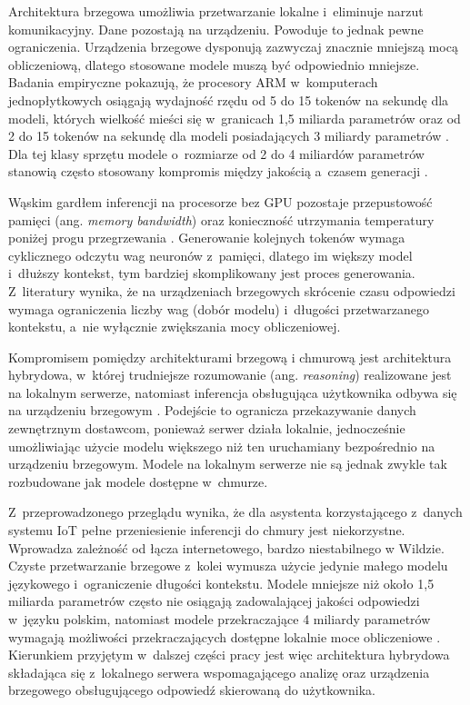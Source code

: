 Architektura brzegowa umożliwia przetwarzanie lokalne i~eliminuje narzut komunikacyjny. Dane pozostają na urządzeniu. Powoduje to jednak pewne ograniczenia. Urządzenia brzegowe dysponują zazwyczaj znacznie mniejszą mocą obliczeniową, dlatego stosowane modele muszą być odpowiednio mniejsze. Badania empiryczne pokazują, że procesory ARM w~komputerach jednopłytkowych osiągają wydajność rzędu od 5 do 15 tokenów na sekundę dla modeli, których wielkość mieści się w~granicach 1,5 miliarda parametrów oraz od 2 do 15 tokenów na sekundę dla modeli posiadających 3 miliardy parametrów \cite{Nguyen2025SBC}. Dla tej klasy sprzętu modele o~rozmiarze od 2 do 4 miliardów parametrów stanowią często stosowany kompromis między jakością a~czasem generacji \cite{Nguyen2025SBC}. 

Wąskim gardłem inferencji na procesorze bez GPU pozostaje przepustowość pamięci (ang. \emph{memory bandwidth}) oraz konieczność utrzymania temperatury poniżej progu przegrzewania \cite{Kim2023SqueezeLLM,Tummalapalli2026}. Generowanie kolejnych tokenów wymaga cyklicznego odczytu wag neuronów z~pamięci, dlatego im większy model i~dłuższy kontekst, tym bardziej skomplikowany jest proces generowania. Z~literatury wynika, że na urządzeniach brzegowych skrócenie czasu odpowiedzi wymaga ograniczenia liczby wag (dobór modelu) i~długości przetwarzanego kontekstu, a~nie wyłącznie zwiększania mocy obliczeniowej.

Kompromisem pomiędzy architekturami brzegową i chmurową jest architektura hybrydowa, w~której trudniejsze rozumowanie (ang. \emph{reasoning}) realizowane jest na lokalnym serwerze, natomiast inferencja obsługująca użytkownika odbywa się na urządzeniu brzegowym \cite{Renney2026}. Podejście to ogranicza przekazywanie danych zewnętrznym dostawcom, ponieważ serwer działa lokalnie, jednocześnie umożliwiając użycie modelu większego niż ten uruchamiany bezpośrednio na urządzeniu brzegowym. Modele na lokalnym serwerze nie są jednak zwykle tak rozbudowane jak modele dostępne w~chmurze.

Z~przeprowadzonego przeglądu wynika, że dla asystenta korzystającego z~danych systemu IoT pełne przeniesienie inferencji do chmury jest niekorzystne. Wprowadza zależność od łącza internetowego, bardzo niestabilnego w Wildzie. Czyste przetwarzanie brzegowe z~kolei wymusza użycie jedynie małego modelu językowego i~ograniczenie długości kontekstu. Modele mniejsze niż około 1,5 miliarda parametrów często nie osiągają zadowalającej jakości odpowiedzi w~języku polskim, natomiast modele przekraczające 4 miliardy parametrów wymagają możliwości przekraczających dostępne lokalnie moce obliczeniowe \cite{Nguyen2025SBC}. Kierunkiem przyjętym w~dalszej części pracy jest więc architektura hybrydowa składająca się z~lokalnego serwera wspomagającego analizę oraz urządzenia brzegowego obsługującego odpowiedź skierowaną do użytkownika.


